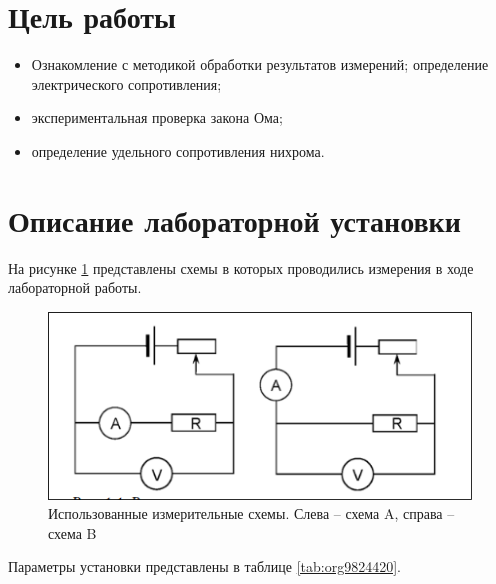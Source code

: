 \documentclass[14pt]{extarticle}
\begin{document}
\tableofcontents \clearpage


\section{Цель работы}
\label{sec:org3b6a1a0}

\begin{itemize}
\item Ознакомление с методикой обработки результатов измерений;
определение электрического сопротивления;
\item экспериментальная проверка закона Ома;
\item определение удельного сопротивления нихрома.
\end{itemize}

\section{Описание лабораторной установки}
\label{sec:orge6b114b}

На рисунке \ref{fig:org74bfd61} представлены схемы в которых проводились измерения в ходе
лабораторной работы.

\begin{figure}[H]
\centering
\includegraphics[width=.9\linewidth]{./images/twoSchemes.png}
\caption{\label{fig:org74bfd61}Использованные измерительные схемы. Слева – схема A, справа – схема B}
\end{figure}

Параметры установки представлены в таблице \ref{tab:org9824420}.
\end{document}
